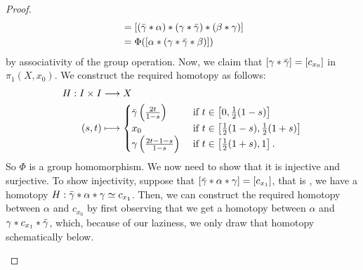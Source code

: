 \documentclass[letterpaper,11pt,twoside]{article}
\theoremstyle{definition}
\theoremstyle{definition}
\theoremstyle{definition}
\theoremstyle{definition}
\theoremstyle{definition}
\theoremstyle{definition}
\theoremstyle{remark}
\theoremstyle{definition}
\begin{document}
\begin{proof}
    \begin{align*}
        [(\Bar{\gamma}*\alpha * \gamma) *(\Bar{\gamma}*\beta *\gamma)] &= [(\Bar{\gamma}*\alpha) * (\gamma *\Bar{\gamma})*(\beta *\gamma)]\\
        &= \Phi([\alpha * (\gamma *\Bar{\gamma}*\beta)])
    \end{align*}
    by associativity of the group operation. Now, we claim that $[\gamma * \Bar{\gamma}] = [c_{x_0}]$ in $\pi_1(X,x_0)$. We construct the required homotopy as follows:
    \begin{align*}
        H : I\times I &\longrightarrow X\\
        (s,t) &\longmapsto \begin{cases}
            \Bar{\gamma}\left( \frac{2t}{1-s} \right) &\text{ if }t\in \left[0,\frac{1}{2}(1-s)\right] \\
                        x_0 &\text{ if }t\in \left[\frac{1}{2}(1-s), \frac{1}{2}(1+s)\right] \\
            \gamma\left( \frac{2t-1-s}{1-s} \right) &\text{ if }t\in \left[ \frac{1}{2}(1+s),1 \right].
        \end{cases}
    \end{align*}
    So $\Phi$ is a group homomorphism. We now need to show that it is injective and surjective. To show injectivity, suppose that $[\Bar{\gamma} * \alpha * \gamma] = [c_{x_1}]$, that is , we have a homotopy $H : \Bar{\gamma}*\alpha *\gamma \simeq c_{x_1}$.  Then, we can construct the required homotopy between $\alpha $ and $c_{x_0}$ by first observing that we get a homotopy between $\alpha$ and $\gamma *c_{x_1} * \Bar{\gamma}$, which, because of our laziness, we only draw that homotopy schematically below.
    \begin{figure}[h!]
        \centering
 
\tikzset{
pattern size/.store in=\mcSize, 
pattern size = 5pt,
pattern thickness/.store in=\mcThickness, 
pattern thickness = 0.3pt,
pattern radius/.store in=\mcRadius, 
pattern radius = 1pt}
\makeatletter
{}
\makeatother
{} %


\end{figure}
\end{proof}
\end{document}
